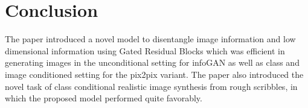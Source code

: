 \documentclass[10pt,twocolumn,letterpaper]{article}
\begin{document}
\section{Conclusion}
The paper introduced a novel model to disentangle image information and low dimensional information using Gated Residual Blocks which was efficient in generating images in the unconditional setting for infoGAN as well as class and image conditioned setting for the pix2pix variant. The paper also introduced the novel task of class conditional realistic image synthesis from rough scribbles, in which the proposed model performed quite favorably.



{\small


}
\end{document}
